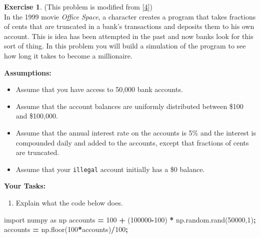 \documentclass[
]{book}
\newenvironment{Shaded}{\begin{snugshade}}{\end{snugshade}}
\newcommand{\DecValTok}[1]{\textcolor[rgb]{0.00,0.00,0.81}{#1}}
\newcommand{\ImportTok}[1]{#1}
\newcommand{\NormalTok}[1]{#1}
\newcommand{\OperatorTok}[1]{\textcolor[rgb]{0.81,0.36,0.00}{\textbf{#1}}}
\providecommand{\tightlist}{%
  \setlength{\itemsep}{0pt}\setlength{\parskip}{0pt}}
\theoremstyle{definition}
\theoremstyle{definition}
\theoremstyle{definition}
\newtheorem{exercise}{Exercise}[chapter]
\theoremstyle{remark}
\begin{document}
\begin{exercise}
\protect\hypertarget{exr:unnamed-chunk-63}{}{\label{exr:unnamed-chunk-63} }(This problem is modified from {[}\protect\hyperlink{ref-chartier}{4}{]})\\
In the 1999 movie \emph{Office Space}, a character creates a program that
takes fractions of cents that are truncated in a bank's transactions and
deposits them to his own account. This is idea has been attempted in the
past and now banks look for this sort of thing. In this problem you will
build a simulation of the program to see how long it takes to become a
millionaire.

\textbf{Assumptions:}

\begin{itemize}
\tightlist
\item
  Assume that you have access to 50,000 bank accounts.
\item
  Assume that the account balances are uniformly distributed between \$100 and \$100,000.
\item
  Assume that the annual interest rate on the accounts is 5\% and the interest is compounded daily and added to the accounts, except that fractions of cents are truncated.
\item
  Assume that your \texttt{illegal} account initially has a \$0 balance.
\end{itemize}

\textbf{Your Tasks:}

\begin{enumerate}
\def\labelenumi{\alph{enumi}.}
\tightlist
\item
  Explain what the code below does.
\end{enumerate}
\end{exercise}

\begin{Shaded}
\begin{Highlighting}[]
\ImportTok{import}\NormalTok{ numpy }\ImportTok{as}\NormalTok{ np}
\NormalTok{accounts }\OperatorTok{=} \DecValTok{100} \OperatorTok{+}\NormalTok{ (}\DecValTok{100000}\OperatorTok{{-}}\DecValTok{100}\NormalTok{) }\OperatorTok{*}\NormalTok{ np.random.rand(}\DecValTok{50000}\NormalTok{,}\DecValTok{1}\NormalTok{)}\OperatorTok{;}
\NormalTok{accounts }\OperatorTok{=}\NormalTok{ np.floor(}\DecValTok{100}\OperatorTok{*}\NormalTok{accounts)}\OperatorTok{/}\DecValTok{100}\OperatorTok{;}
\end{Highlighting}
\end{Shaded}
\end{document}
